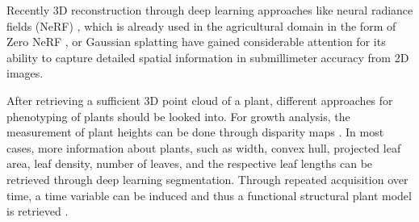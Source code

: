 \documentclass[conference,]{IEEEtran}
\begin{document}
Recently 3D reconstruction through deep learning approaches like neural
radiance fields (NeRF) \autocite{gao}, which is already used in the
agricultural domain in the form of Zero NeRF \autocite{peat2022}, or
Gaussian splatting \autocite{kerbl} have gained considerable attention
for its ability to capture detailed spatial information in submillimeter
accuracy from 2D images.

After retrieving a sufficient 3D point cloud of a plant, different
approaches for phenotyping of plants should be looked into. For growth
analysis, the measurement of plant heights can be done through disparity
maps \autocite{matsuura2023}. In most cases, more information about
plants, such as width, convex hull, projected leaf area, leaf density,
number of leaves, and the respective leaf lengths can be retrieved
through deep learning segmentation. Through repeated acquisition over
time, a time variable can be induced and thus a functional structural
plant model is retrieved \autocite{paulus2019,li2022,soualiou2021}.

\newpage

\printbibliography[title=References]
\end{document}
